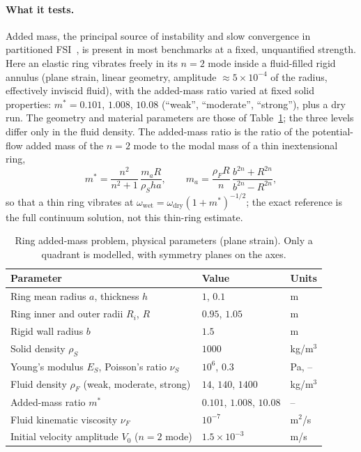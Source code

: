 \paragraph{What it tests.}
Added mass, the principal source of instability and slow convergence in partitioned FSI~\citep{Causin2005}, is present in most benchmarks at a fixed, unquantified strength.
Here an elastic ring vibrates freely in its $n=2$ mode inside a fluid-filled rigid annulus (plane strain, linear geometry, amplitude $\approx5\times10^{-4}$ of the radius, effectively inviscid fluid), with the added-mass ratio varied at fixed solid properties: $m^* = 0.101$, $1.008$, $10.08$ (``weak'', ``moderate'', ``strong''), plus a dry run.
The geometry and material parameters are those of Table~\ref{tab:ring_params}; the three levels differ only in the fluid density.
The added-mass ratio is the ratio of the potential-flow added mass of the $n=2$ mode to the modal mass of a thin inextensional ring,
\begin{equation}
m^* = \frac{n^2}{n^2+1}\,\frac{m_a R}{\rho_S h a},
\qquad
m_a = \frac{\rho_F R}{n}\,\frac{b^{2n}+R^{2n}}{b^{2n}-R^{2n}},
\end{equation}
so that a thin ring vibrates at $\omega_{\mathrm{wet}} = \omega_{\mathrm{dry}}(1+m^*)^{-1/2}$; the exact reference is the full continuum solution, not this thin-ring estimate.
\begin{table}[htbp]
	\centering
	\small
	\caption{Ring added-mass problem, physical parameters (plane strain). Only a quadrant is modelled, with symmetry planes on the axes.}
	\label{tab:ring_params}
	\begin{tabular}{lll}
		\toprule
		Parameter & Value & Units \\
		\midrule
		Ring mean radius $a$, thickness $h$ & $1$, $0.1$ & m \\
		Ring inner and outer radii $R_i$, $R$ & $0.95$, $1.05$ & m \\
		Rigid wall radius $b$ & $1.5$ & m \\
		Solid density $\rho_S$ & $1000$ & kg/m$^3$ \\
		Young's modulus $E_S$, Poisson's ratio $\nu_S$ & $10^{6}$, $0.3$ & Pa, -- \\
		Fluid density $\rho_F$ (weak, moderate, strong) & $14$, $140$, $1400$ & kg/m$^3$ \\
		Added-mass ratio $m^*$ & $0.101$, $1.008$, $10.08$ & -- \\
		Fluid kinematic viscosity $\nu_F$ & $10^{-7}$ & m$^2$/s \\
		Initial velocity amplitude $V_0$ ($n=2$ mode) & $1.5\times10^{-3}$ & m/s \\
		\bottomrule
	\end{tabular}
\end{table}

